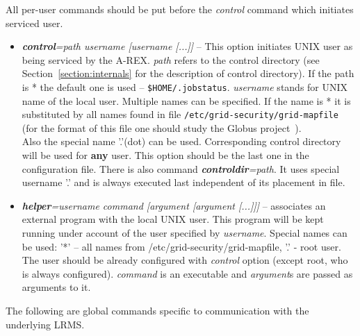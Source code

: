 \documentclass{article}                            %
\begin{document}
All per-user commands should be put before the \textit{control} command
which initiates serviced user.

\begin{itemize}
\item \textbf{\textit{control}}\textit{=path username {[}username
    {[}...]]} -- This option initiates UNIX user as being serviced by
  the A-REX.  \textit{path} refers to the control directory (see
  Section~\ref{section:internals} for the description of control
  directory). If the path is {*} the default one is used --
  \verb|$HOME/.jobstatus|. \textit{username} stands for UNIX name of
  the local user. Multiple names can be specified.  If the name is {*}
  it is substituted by all names found in file
  \texttt{/etc/grid-security/grid-mapfile} (for the format of this
  file one should study the Globus project~\cite{globus}).\\ Also the
  special name '.'(dot) can be used. Corresponding control directory
  will be used for \textbf{any} user. This option should be the last
  one in the configuration file. There is also command
  \textbf{\textit{controldir}}\textit{=path}.  It uses special
  username '.' and is always executed last independent of its
  placement in file.
\item \textbf{\textit{helper}}\textit{=username command {[}argument
    {[}argument {[}...]]]} -- associates an external program with the
  local UNIX user.  This program will be kept running under account of
  the user specified by \textit{username}. Special names can be used:
  '{*}' -- all names from /etc/grid-security/grid-mapfile, '.'  - root
  user. The user should be already configured with \textit{control}
  option (except root, who is always configured). \textit{command} is
  an executable and \textit{argument}s are passed as arguments to it.
\end{itemize}


The following are global commands specific to communication with the underlying
LRMS.

\end{document}
